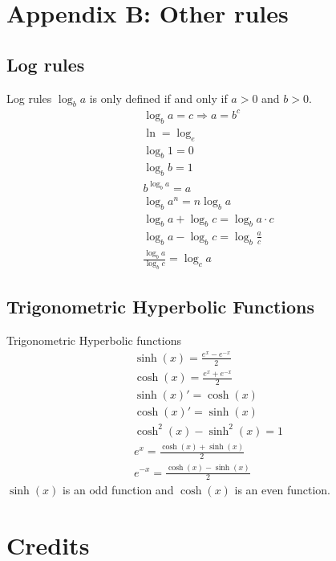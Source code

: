 \documentclass[letterpaper,10pt,twoside,twocolumn,openany]{book}
\begin{document}
\twocolumn

\chapter*{Appendix B: Other rules}
\section{Log rules}
\begin{DndSidebar}{Log rules}
    $\log_b a$ is only defined if and only if $a > 0$ and $ b > 0$.
    \begin{gather}
        \log_b a = c \Rightarrow a = b^c\\
        \ln = \log_e\\
        \log_b 1 = 0\\
        \log_b b = 1\\
        b^{\log_b a} = a\\
        \log_b a^n = n \log_b a\\
        \log_b a + \log_b c = \log_b a \cdot c\\
        \log_b a - \log_b c = \log_b \frac{a}{c}\\
        \frac{\log_b a}{\log_b c} = \log_c a 
    \end{gather}
\end{DndSidebar}


\section{Trigonometric Hyperbolic Functions}
\begin{DndSidebar}{Trigonometric Hyperbolic functions}
    \begin{gather}
        \sinh (x) = \frac{e^x - e^{-x}}{2}\\
        \cosh (x) = \frac{e^x + e^{-x}}{2}\\
        \sinh(x)' = \cosh(x)\\
        \cosh(x)' = \sinh(x)\\
        \cosh^2(x) - \sinh^2(x) = 1\\
        e^x = \frac{\cosh(x) + \sinh(x)}{2}\\
        e^{-x} = \frac{\cosh(x) - \sinh(x)}{2}
    \end{gather}
    $\sinh (x)$ is an odd function and $ \cosh(x)$ is an even function.
\end{DndSidebar}
\chapter*{Credits}
\end{document}
